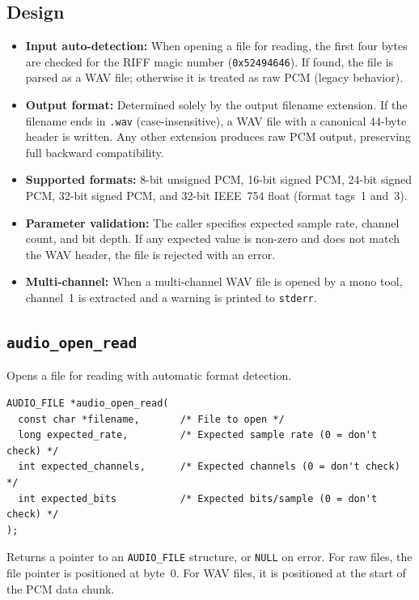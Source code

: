\subsection{Design}

\begin{itemize}
\item {\bf Input auto-detection:} When opening a file for reading, the first
  four bytes are checked for the RIFF magic number ({\tt 0x52494646}). If
  found, the file is parsed as a WAV file; otherwise it is treated as raw
  PCM (legacy behavior).
\item {\bf Output format:} Determined solely by the output filename extension.
  If the filename ends in {\tt .wav} (case-insensitive), a WAV file with a
  canonical 44-byte header is written. Any other extension produces raw PCM
  output, preserving full backward compatibility.
\item {\bf Supported formats:} 8-bit unsigned PCM, 16-bit signed PCM, 24-bit
  signed PCM, 32-bit signed PCM, and 32-bit IEEE~754 float (format tags~1
  and~3).
\item {\bf Parameter validation:} The caller specifies expected sample rate,
  channel count, and bit depth. If any expected value is non-zero and does not
  match the WAV header, the file is rejected with an error.
\item {\bf Multi-channel:} When a multi-channel WAV file is opened by a mono
  tool, channel~1 is extracted and a warning is printed to {\tt stderr}.
\end{itemize}

\subsection{{\tt audio\_open\_read}}

Opens a file for reading with automatic format detection.

{\small
\begin{verbatim}
AUDIO_FILE *audio_open_read(
  const char *filename,       /* File to open */
  long expected_rate,         /* Expected sample rate (0 = don't check) */
  int expected_channels,      /* Expected channels (0 = don't check) */
  int expected_bits           /* Expected bits/sample (0 = don't check) */
);
\end{verbatim}
}

Returns a pointer to an {\tt AUDIO\_FILE} structure, or {\tt NULL} on error.
For raw files, the file pointer is positioned at byte~0. For WAV files, it is
positioned at the start of the PCM data chunk.


